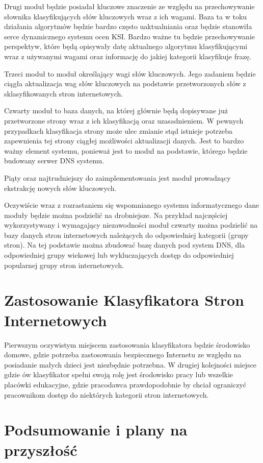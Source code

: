\documentclass[9pt,twoside,a4paper]{article}
\begin{document}
Drugi moduł będzie posiadał kluczowe znaczenie ze względu na przechowywanie słownika klasyfikujących słów kluczowych wraz z ich wagami. Baza ta w toku działania algorytmów będzie bardzo często uaktualniania oraz będzie stanowiła serce dynamicznego systemu ocen KSI. Bardzo ważne tu będzie przechowywanie perspektyw, które będą opisywały datę aktualnego algorytmu klasyfikującymi wraz z używanymi wagami oraz informację do jakiej kategorii klasyfikuje frazę.

Trzeci moduł to moduł określający wagi słów kluczowych. Jego zadaniem będzie ciągła aktualizacja wag słów kluczowych na podstawie przetworzonych słów z sklasyfikowanych stron internetowych.

Czwarty moduł to baza danych, na której głównie będą dopisywane już przetworzone strony wraz z ich klasyfikacją oraz uzasadnieniem. W pewnych przypadkach klasyfikacja strony może ulec zmianie stąd istnieje potrzeba zapewnienia tej strony ciągłej możliwości aktualizacji danych. Jest to bardzo ważny element systemu, ponieważ jest to moduł na podstawie, którego będzie budowany serwer DNS systemu.

Piąty oraz najtrudniejszy do zaimplementowania jest moduł prowadzący ekstrakcję nowych słów kluczowych.

Oczywiście wraz z rozrastaniem się wspomnianego systemu informatycznego dane moduły będzie można podzielić na drobniejsze. Na przykład najczęściej wykorzystywany i wymagający niezawodności moduł czwarty można podzielić na bazy danych stron internetowych należących do odpowiedniej kategorii (grupy stron). Na tej podstawie można zbudować bazę danych pod system DNS, dla odpowiedniej grupy wiekowej lub wykluczających dostęp do odpowiedniej popularnej grupy stron internetowych.

\section{Zastosowanie Klasyfikatora Stron Internetowych}

Pierwszym oczywistym miejscem zastosowania klasyfikatora będzie środowisko domowe, gdzie potrzeba zastosowania bezpiecznego Internetu ze względu na posiadanie małych dzieci jest niezbędnie potrzebna. W drugiej kolejności miejsce gdzie ów klasyfikator spełni swoją rolę jest środowisko pracy lub wszelkie placówki edukacyjne, gdzie pracodawca prawdopodobnie by chciał ograniczyć pracownikom dostęp do niektórych kategorii stron internetowych.

\section{Podsumowanie i plany na przyszłość}
\end{document}
